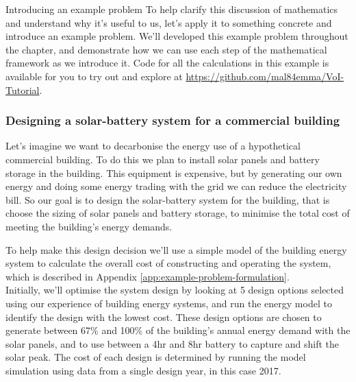 \begin{ebox}[label=ebox:opt]{Introducing an example problem}
    To help clarify this discussion of mathematics and understand why it's useful to us, let's apply it to something concrete and introduce an example problem. We'll developed this example problem throughout the chapter, and demonstrate how we can use each step of the mathematical framework as we introduce it. Code for all the calculations in this example is available for you to try out and explore at \url{https://github.com/mal84emma/VoI-Tutorial}.

    \subsubsection*{Designing a solar-battery system for a commercial building}
    Let's imagine we want to decarbonise the energy use of a hypothetical commercial building. To do this we plan to install solar panels and battery storage in the building. This equipment is expensive, but by generating our own energy and doing some energy trading with the grid we can reduce the electricity bill. So our goal is to design the solar-battery system for the building, that is choose the sizing of solar panels and battery storage, to minimise the total cost of meeting the building's energy demands.

    To help make this design decision we'll use a simple model of the building energy system to calculate the overall cost of constructing and operating the system, which is described in Appendix \ref{app:example-problem-formulation}.\\

    Initially, we'll optimise the system design by looking at 5 design options selected using our experience of building energy systems, and run the energy model to identify the design with the lowest cost. These design options are chosen to generate between 67\% and 100\% of the building's annual energy demand with the solar panels, and to use between a 4hr and 8hr battery to capture and shift the solar peak. The cost of each design is determined by running the model simulation using data from a single design year, in this case 2017.\\


\end{ebox}
